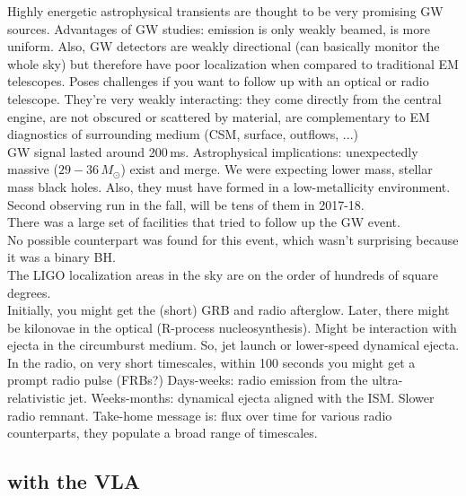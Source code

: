 \documentclass[a4paper]{article}
\begin{document}
Highly energetic astrophysical transients are thought to be very promising GW sources. Advantages of GW studies: emission is only weakly beamed, is more uniform. Also, GW detectors are weakly directional (can basically monitor the whole sky) but therefore have poor localization when compared to traditional EM telescopes. Poses challenges if you want to follow up with an optical or radio telescope. They're very weakly interacting: they come directly from the central engine, are not obscured or scattered by material, are complementary to EM diagnostics of surrounding medium (CSM, surface, outflows, ...) \\

GW signal lasted around 200\,ms. Astrophysical implications: unexpectedly massive ($29-36\,M_\odot$) exist and merge. We were expecting lower mass, stellar mass black holes. Also, they must have formed in a low-metallicity environment. \\

Second observing run in the fall, will be tens of them in 2017-18. \\

There was a large set of facilities that tried to follow up the GW event. \\

No possible counterpart was found for this event, which wasn't surprising because it was a binary BH. \\

The LIGO localization areas in the sky are on the order of hundreds of square degrees. \\

Initially, you might get the (short) GRB and radio afterglow. Later, there might be kilonovae in the optical (R-process nucleosynthesis). Might be interaction with ejecta in the circumburst medium. So, jet launch or lower-speed dynamical ejecta. \\

In the radio, on very short timescales, within 100 seconds you might get a prompt radio pulse (FRBs?) Days-weeks: radio emission from the ultra-relativistic jet. Weeks-months: dynamical ejecta aligned with the ISM. Slower radio remnant. Take-home message is: flux over time for various radio counterparts, they populate a broad range of timescales.

\subsection{with the VLA}
\end{document}
